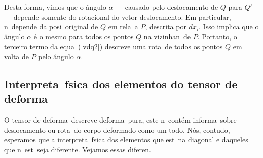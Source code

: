 Desta forma, vimos que o \^angulo $\alpha$ --- causado pelo deslocamento de $Q$
para $Q'$ --- depende somente do rotacional do vetor deslocamento. Em
particular, n\ao\ depende da posi\cao\ original de $Q$ em rela\cao\ a
$P$, descrita por $dx_i$. Isso implica que o \^angulo $\alpha$ \'e o
mesmo para todos os pontos $Q$ na vizinhan\ca\ de $P$.
Portanto, o terceiro termo da equa\cao\ (\ref{vdq2}) descreve
uma rota\cao\ de todos os pontos $Q$ em volta de $P$ pelo \^angulo
$\alpha$.

\subsection{Interpreta\cao\ f\ih sica dos elementos do %
tensor de deforma\cao}

O tensor de deforma\cao\ descreve deforma\cao\ pura, este
n\ao\ cont\'em informa\cao\ sobre deslocamento ou
rota\cao\ do corpo deformado como um todo. N\'os, contudo, esperamos
que a interpreta\cao\ f\ih sica dos elementos que
est\ao\ na diagonal e daqueles que n\ao\ est\ao\ seja
diferente. Vejamos essas diferen\cas.

